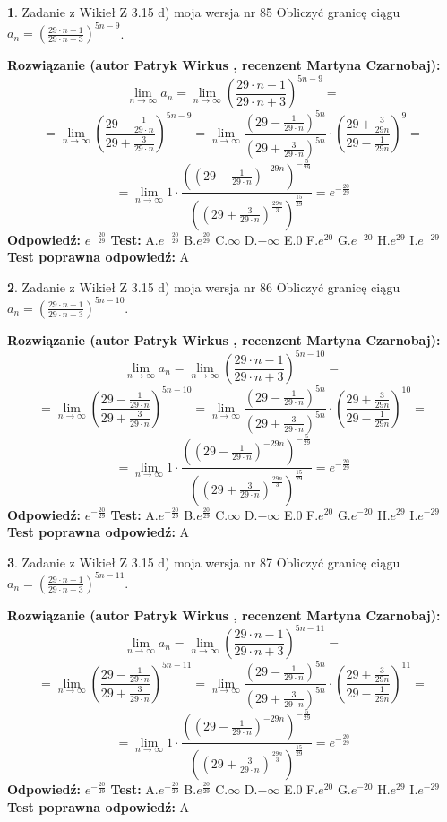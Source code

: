 \documentclass[12pt, a4paper]{article}
\theoremstyle{definition} %
\newtheorem{zad}{}
\newcommand{\zadStart}[1]{\begin{zad}#1\newline}
\newcommand{\zadStop}{\end{zad}}
\newcommand{\rozwStart}[2]{\noindent \textbf{Rozwiązanie (autor #1 , recenzent #2): }\newline}
\newcommand{\rozwStop}{\newline}
\newcommand{\odpStart}{\noindent \textbf{Odpowiedź:}\newline}
\newcommand{\odpStop}{\newline}
\newcommand{\testStart}{\noindent \textbf{Test:}\newline}
\newcommand{\testStop}{\newline}
\newcommand{\kluczStart}{\noindent \textbf{Test poprawna odpowiedź:}\newline}
\newcommand{\kluczStop}{\newline}
\begin{document}
\zadStart{Zadanie z Wikieł Z 3.15 d) moja wersja nr 85}
Obliczyć granicę ciągu $a_{n}=(\frac{29\cdot n - 1}{29 \cdot n + 3})^{5n-9}$.
\zadStop
\rozwStart{Patryk Wirkus}{Martyna Czarnobaj}
$$\lim\limits_{n\to\infty} a_{n} = \lim\limits_{n\to\infty}(\frac{29\cdot n - 1}{29 \cdot n + 3})^{5n-9}=$$
$$=\lim\limits_{n\to\infty}(\frac{29 - \frac{1}{29\cdot n}}{29 + \frac{3}{29 \cdot n}})^{5n-9}=\lim\limits_{n\to\infty}\frac{(29 - \frac{1}{29\cdot n})^{5n}}{(29 + \frac{3}{29\cdot n})^{5n}} \cdot (\frac{29+\frac{3}{29n}}{29-\frac{1}{29n}})^{9}=$$
$$=\lim\limits_{n\to\infty} 1 \cdot \frac{((29-\frac{1}{29 \cdot n})^{-29n})^{-\frac{5}{29}}}{((29+\frac{3}{29 \cdot n})^{\frac{29n}{3}})^{\frac{15}{29}}} =e^{-\frac{20}{29}}$$
\rozwStop
\odpStart
$e^{-\frac{20}{29}}$
\odpStop
\testStart
A.$ e^{-\frac{20}{29}}$
B.$ e^{\frac{20}{29}}$
C.$\infty$
D.$-\infty$
E.$0$
F.$e^{20}$
G.$e^{-20}$
H.$e^{29}$
I.$e^{-29}$
\testStop
\kluczStart
A
\kluczStop



\zadStart{Zadanie z Wikieł Z 3.15 d) moja wersja nr 86}
Obliczyć granicę ciągu $a_{n}=(\frac{29\cdot n - 1}{29 \cdot n + 3})^{5n-10}$.
\zadStop
\rozwStart{Patryk Wirkus}{Martyna Czarnobaj}
$$\lim\limits_{n\to\infty} a_{n} = \lim\limits_{n\to\infty}(\frac{29\cdot n - 1}{29 \cdot n + 3})^{5n-10}=$$
$$=\lim\limits_{n\to\infty}(\frac{29 - \frac{1}{29\cdot n}}{29 + \frac{3}{29 \cdot n}})^{5n-10}=\lim\limits_{n\to\infty}\frac{(29 - \frac{1}{29\cdot n})^{5n}}{(29 + \frac{3}{29\cdot n})^{5n}} \cdot (\frac{29+\frac{3}{29n}}{29-\frac{1}{29n}})^{10}=$$
$$=\lim\limits_{n\to\infty} 1 \cdot \frac{((29-\frac{1}{29 \cdot n})^{-29n})^{-\frac{5}{29}}}{((29+\frac{3}{29 \cdot n})^{\frac{29n}{3}})^{\frac{15}{29}}} =e^{-\frac{20}{29}}$$
\rozwStop
\odpStart
$e^{-\frac{20}{29}}$
\odpStop
\testStart
A.$ e^{-\frac{20}{29}}$
B.$ e^{\frac{20}{29}}$
C.$\infty$
D.$-\infty$
E.$0$
F.$e^{20}$
G.$e^{-20}$
H.$e^{29}$
I.$e^{-29}$
\testStop
\kluczStart
A
\kluczStop



\zadStart{Zadanie z Wikieł Z 3.15 d) moja wersja nr 87}
Obliczyć granicę ciągu $a_{n}=(\frac{29\cdot n - 1}{29 \cdot n + 3})^{5n-11}$.
\zadStop
\rozwStart{Patryk Wirkus}{Martyna Czarnobaj}
$$\lim\limits_{n\to\infty} a_{n} = \lim\limits_{n\to\infty}(\frac{29\cdot n - 1}{29 \cdot n + 3})^{5n-11}=$$
$$=\lim\limits_{n\to\infty}(\frac{29 - \frac{1}{29\cdot n}}{29 + \frac{3}{29 \cdot n}})^{5n-11}=\lim\limits_{n\to\infty}\frac{(29 - \frac{1}{29\cdot n})^{5n}}{(29 + \frac{3}{29\cdot n})^{5n}} \cdot (\frac{29+\frac{3}{29n}}{29-\frac{1}{29n}})^{11}=$$
$$=\lim\limits_{n\to\infty} 1 \cdot \frac{((29-\frac{1}{29 \cdot n})^{-29n})^{-\frac{5}{29}}}{((29+\frac{3}{29 \cdot n})^{\frac{29n}{3}})^{\frac{15}{29}}} =e^{-\frac{20}{29}}$$
\rozwStop
\odpStart
$e^{-\frac{20}{29}}$
\odpStop
\testStart
A.$ e^{-\frac{20}{29}}$
B.$ e^{\frac{20}{29}}$
C.$\infty$
D.$-\infty$
E.$0$
F.$e^{20}$
G.$e^{-20}$
H.$e^{29}$
I.$e^{-29}$
\testStop
\kluczStart
A
\kluczStop
\end{document}
